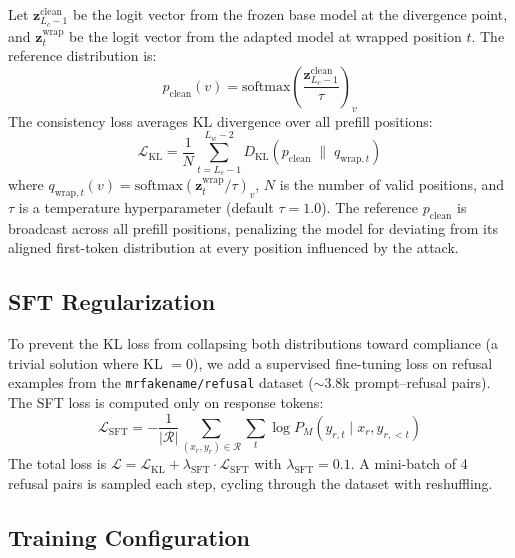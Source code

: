 \documentclass{article}
\begin{document}
Let $\mathbf{z}^{\text{clean}}_{L_c-1}$ be the logit vector from the frozen base model at the divergence point, and $\mathbf{z}^{\text{wrap}}_{t}$ be the logit vector from the adapted model at wrapped position $t$. The reference distribution is:
\begin{equation}
    p_{\text{clean}}(v) = \text{softmax}\!\left(\frac{\mathbf{z}^{\text{clean}}_{L_c-1}}{\tau}\right)_v
\end{equation}
The consistency loss averages KL divergence over all prefill positions:
\begin{equation}
    \mathcal{L}_{\text{KL}} = \frac{1}{N} \sum_{t=L_c-1}^{L_w - 2} D_{\text{KL}}\!\left(p_{\text{clean}} \;\|\; q_{\text{wrap},t}\right)
\end{equation}
where $q_{\text{wrap},t}(v) = \text{softmax}(\mathbf{z}^{\text{wrap}}_{t} / \tau)_v$, $N$ is the number of valid positions, and $\tau$ is a temperature hyperparameter (default $\tau = 1.0$). The reference $p_{\text{clean}}$ is broadcast across all prefill positions, penalizing the model for deviating from its aligned first-token distribution at every position influenced by the attack.

\subsection{SFT Regularization}

To prevent the KL loss from collapsing both distributions toward compliance (a trivial solution where KL $= 0$), we add a supervised fine-tuning loss on refusal examples from the \texttt{mrfakename/refusal} dataset (${\sim}3.8$k prompt--refusal pairs). The SFT loss is computed only on response tokens:
\begin{equation}
    \mathcal{L}_{\text{SFT}} = -\frac{1}{|\mathcal{R}|} \sum_{(x_r, y_r) \in \mathcal{R}} \sum_{t} \log P_M(y_{r,t} \mid x_r, y_{r,<t})
\end{equation}
The total loss is $\mathcal{L} = \mathcal{L}_{\text{KL}} + \lambda_{\text{SFT}} \cdot \mathcal{L}_{\text{SFT}}$ with $\lambda_{\text{SFT}} = 0.1$. A mini-batch of 4 refusal pairs is sampled each step, cycling through the dataset with reshuffling.

\subsection{Training Configuration}
\end{document}

